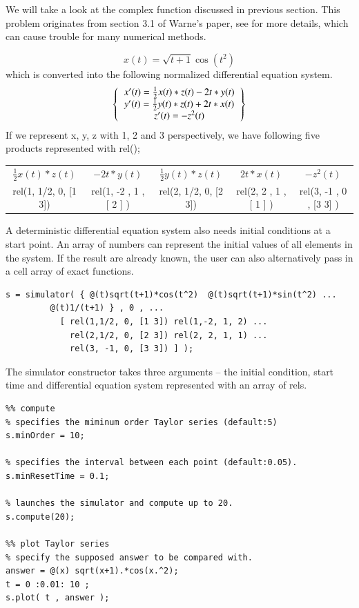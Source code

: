 \documentclass[12pt]{article}
\begin{document}
We will take a look at the complex function discussed in previous section.
This problem originates from section 3.1 of Warne's paper, see \cite{EX} for more details, which can cause trouble for many numerical methods.

\begin{equation}
x(t) = \sqrt{t+1}\cos(t^2)
\end{equation}
which is converted into the following normalized differential equation system.
\[
\left \{
  \begin{tabular}{ccc}
  $x'(t) = \frac{1}{2}x(t)*z(t) - 2t*y(t)$ \\
  $y'(t) = \frac{1}{2}y(t)*z(t) + 2t*x(t)$ \\
  $z'(t) = -z^{2}(t)$
  \end{tabular}
\right \}
\]
If we represent x, y, z with 1, 2 and 3 perspectively, we have following five products represented with rel();

\vspace{0.3cm}
\begin{tabular}{ccccc}
  $\frac{1}{2}x(t)*z(t)$  &  $- 2t*y(t)$ &
  $\frac{1}{2}y(t)*z(t)$ & $2t*x(t)$ & $-z^{2}(t)$ \\
  rel(1, 1/2, 0, [1 3]) & rel(1, -2 , 1 , [ 2 ] ) & 
  rel(2, 1/2, 0, [2 3]) & rel(2, 2 , 1 , [ 1 ] ) & rel(3, -1 , 0 , [3 3] )
\end{tabular}
\vspace{0.2cm}

A deterministic differential equation system also needs initial conditions at a start point. An array of numbers can represent the initial values of all elements in the system. If the result are already known, the user can also alternatively pass in a cell array of exact functions.
\begin{lstlisting}
s = simulator( { @(t)sqrt(t+1)*cos(t^2)  @(t)sqrt(t+1)*sin(t^2) ...
		 @(t)1/(t+1) } , 0 , ...
  	       [ rel(1,1/2, 0, [1 3]) rel(1,-2, 1, 2) ...
    		 rel(2,1/2, 0, [2 3]) rel(2, 2, 1, 1) ...
       		 rel(3, -1, 0, [3 3]) ] );
\end{lstlisting}

The simulator constructor takes three arguments -- the initial condition, start time and differential equation system represented with an array of rels.

\begin{lstlisting}
%% compute
% specifies the miminum order Taylor series (default:5)
s.minOrder = 10; 

% specifies the interval between each point (default:0.05).
s.minResetTime = 0.1; 

% launches the simulator and compute up to 20.
s.compute(20);

%% plot Taylor series
% specify the supposed answer to be compared with.
answer = @(x) sqrt(x+1).*cos(x.^2);
t = 0 :0.01: 10 ;
s.plot( t , answer );
\end{lstlisting}
\end{document}
